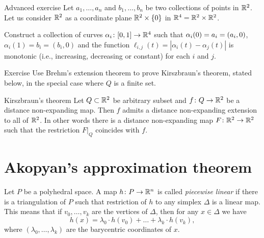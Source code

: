\begin{thm}{Advanced exercise}\label{pr:alexander}
Let $a_1,\dots,a_n$ and $b_1,\dots,b_n$ be two collections of points in $\mathbb{R}^2$.
Let us consider $\mathbb{R}^2$ as a coordinate plane $\mathbb{R}^2 \times \{0\}$
in $\mathbb{R}^4=\mathbb{R}^2 \times \mathbb{R}^2$.

Construct a collection of curves $\alpha_i\colon[0,1]\to \mathbb{R}^4$ 
such that
$\alpha_i(0)=a_i\z=(a_i,0)$, $\alpha_i(1)=b_i=(b_i,0)$ and 
the function $\ell_{i,j}(t)=|\alpha_i(t)-\alpha_j(t)|$ 
is monotonic (i.e., increasing, decreasing or constant) for each $i$ and $j$.
\end{thm}

\begin{thm}{Exercise}\label{pr:brehm}
Use Brehm's extension theorem 
to prove Kirszbraun's theorem, stated below, in the special case where $Q$ is a finite set.
\end{thm}



\begin{thm}{Kirszbraun's theorem}
Let $Q\subset \mathbb{R}^2$ be arbitrary subset and $f\colon Q\to\mathbb{R}^2$ be a distance non-expanding map.
Then $f$ admits 
a distance non-expanding extension to all of $\mathbb{R}^2$.
In other words there is a distance  non-expanding map $F\colon\mathbb{R}^2\to\mathbb{R}^2$ 
such that the restriction $F|_{Q}$ coincides with $f$.
\end{thm}



\chapter{Akopyan's approximation theorem}

Let $P$ be a polyhedral space.
A map $h\colon P\to\mathbb{R}^n$ is called 
\emph{piecewise linear}\label{page:piecewise linear map}
if there is a triangulation of $P$ such that 
restriction of $h$ to any simplex $\Delta$ is a linear map.
This means that if $v_0,\dots,v_k$ are the vertices of $\Delta$,
then for any $x\in \Delta$ we have
\[h(x)
=
\lambda_0\cdot h(v_0)+\dots+\lambda_k\cdot h(v_k),\]
where $(\lambda_0,\dots,\lambda_k)$ are the barycentric coordinates of $x$.

